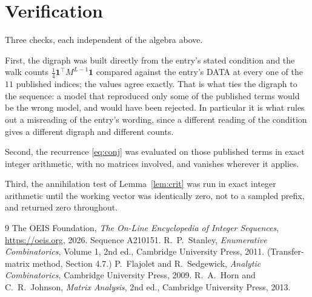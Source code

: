 \documentclass[11pt,a4paper]{article}
\theoremstyle{plain}
\theoremstyle{definition}
\begin{document}
\section{Verification}

Three checks, each independent of the algebra above.

First, the digraph was built directly from the entry's stated condition and the walk counts
$\tfrac1{4}\mathbf{1}^{\!\top}M^{L-1}\mathbf{1}$ compared against the entry's DATA at
every one of the $11$ published indices; the values agree exactly. That is what ties
the digraph to the sequence: a model that reproduced only some of the published terms would
be the wrong model, and would have been rejected. In particular it is what rules out a
misreading of the entry's wording, since a different reading of the condition gives a
different digraph and different counts.

Second, the recurrence \eqref{eq:conj} was evaluated on those published terms in exact
integer arithmetic, with no matrices involved, and vanishes wherever it applies.

Third, the annihilation test of Lemma~\ref{lem:crit} was run in exact integer arithmetic
until the working vector was identically zero, not to a sampled prefix, and returned zero
throughout.

\begin{thebibliography}{9}
 The OEIS Foundation, \emph{The On-Line Encyclopedia of Integer
Sequences}, \url{https://oeis.org}, 2026. Sequence A210151.
 R.~P.~Stanley, \emph{Enumerative Combinatorics}, Volume 1, 2nd ed.,
Cambridge University Press, 2011. (Transfer-matrix method, Section 4.7.)
 P.~Flajolet and R.~Sedgewick, \emph{Analytic Combinatorics}, Cambridge
University Press, 2009.
 R.~A.~Horn and C.~R.~Johnson, \emph{Matrix Analysis}, 2nd ed., Cambridge
University Press, 2013.
\end{thebibliography}
\end{document}
